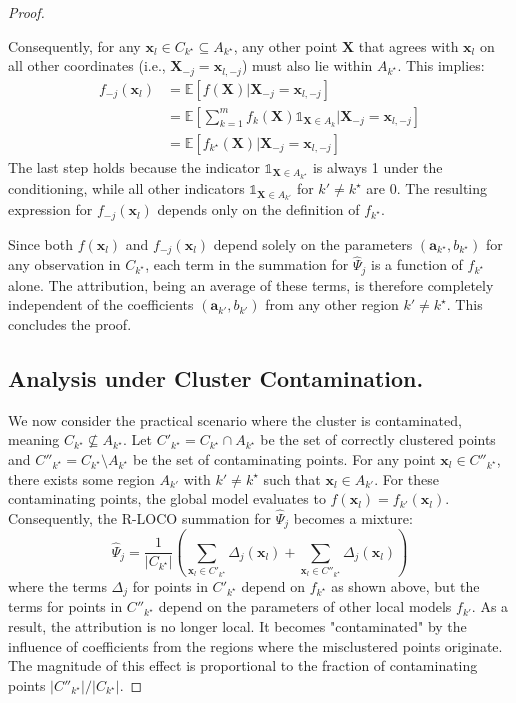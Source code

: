 \documentclass{article}
\theoremstyle{plain}
\theoremstyle{definition}
\theoremstyle{remark}
\begin{document}
\begin{proof}
\begin{enumerate}
    Consequently, for any $\mathbf{x}_l \in C_{k^\star} \subseteq A_{k^\star}$, any other point $\mathbf{X}$ that agrees with $\mathbf{x}_l$ on all other coordinates (i.e., $\mathbf{X}_{-j} = \mathbf{x}_{l, -j}$) must also lie within $A_{k^\star}$. This implies:
    \begin{align*}
        f_{-j}(\mathbf{x}_l) &= \mathbb{E}[f(\mathbf{X}) | \mathbf{X}_{-j} = \mathbf{x}_{l, -j}] \\
        &= \mathbb{E}\left[ \sum_{k=1}^{m} f_k(\mathbf{X}) \mathds{1}_{\mathbf{X} \in A_k} \Big| \mathbf{X}_{-j} = \mathbf{x}_{l, -j} \right] \\
        &= \mathbb{E}[f_{k^\star}(\mathbf{X}) | \mathbf{X}_{-j} = \mathbf{x}_{l, -j}]
    \end{align*}
    The last step holds because the indicator $\mathds{1}_{\mathbf{X} \in A_{k^\star}}$ is always 1 under the conditioning, while all other indicators $\mathds{1}_{\mathbf{X} \in A_{k'}}$ for $k' \neq k^\star$ are 0. The resulting expression for $f_{-j}(\mathbf{x}_l)$ depends only on the definition of $f_{k^\star}$.
\end{enumerate}

\noindent Since both $f(\mathbf{x}_l)$ and $f_{-j}(\mathbf{x}_l)$ depend solely on the parameters $(\mathbf{a}_{k^\star}, b_{k^\star})$ for any observation in $C_{k^\star}$, each term in the summation for $\hat{\Psi}_{j}$ is a function of $f_{k^\star}$ alone. The attribution, being an average of these terms, is therefore completely independent of the coefficients $(\mathbf{a}_{k'}, b_{k'})$ from any other region $k' \neq k^\star$. This concludes the proof.

\subsection{Analysis under Cluster Contamination.} \label{app:rloco_mixed}
 We now consider the practical scenario where the cluster is contaminated, meaning $C_{k^\star} \not\subseteq A_{k^\star}$. Let $C'_{k^\star} = C_{k^\star} \cap A_{k^\star}$ be the set of correctly clustered points and $C''_{k^\star} = C_{k^\star} \setminus A_{k^\star}$ be the set of contaminating points. For any point $\mathbf{x}_l \in C''_{k^\star}$, there exists some region $A_{k'}$ with $k' \neq k^\star$ such that $\mathbf{x}_l \in A_{k'}$. For these contaminating points, the global model evaluates to $f(\mathbf{x}_l) = f_{k'}(\mathbf{x}_l)$. Consequently, the R-LOCO summation for $\hat{\Psi}_{j}$ becomes a mixture:
$$
\hat{\Psi}_{j} = \frac{1}{|C_{k^\star}|} \left( \sum_{\mathbf{x}_l \in C'_{k^\star}} \Delta_j(\mathbf{x}_l) + \sum_{\mathbf{x}_l \in C''_{k^\star}} \Delta_j(\mathbf{x}_l) \right)
$$
where the terms $\Delta_j$ for points in $C'_{k^\star}$ depend on $f_{k^\star}$ as shown above, but the terms for points in $C''_{k^\star}$ depend on the parameters of other local models $f_{k'}$. As a result, the attribution is no longer local. It becomes "contaminated" by the influence of coefficients from the regions where the misclustered points originate. The magnitude of this effect is proportional to the fraction of contaminating points $|C''_{k^\star}| / |C_{k^\star}|$.
\end{proof}
\end{document}
